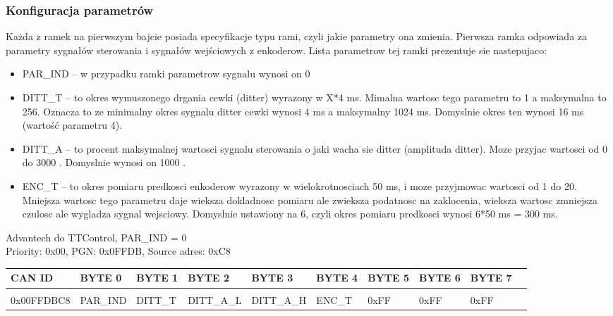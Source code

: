 \documentclass{article}
\begin{document}
\subsubsection{Konfiguracja parametrów}
Każda z ramek na pierwszym bajcie posiada specyfikacje typu rami, czyli jakie parametry ona zmienia.
Pierwsza ramka odpowiada za parametry sygnałów sterowania i sygnałów wejściowych z enkoderow. Lista parametrow tej ramki prezentuje sie nastepujaco:
\begin{itemize}
\item PAR\_IND -- w przypadku ramki parametrow sygnalu wynosi on 0
\item DITT\_T -- to okres wymuszonego drgania cewki (ditter) wyrazony w X*4 ms. Mimalna wartosc tego parametru to 1 a maksymalna to 256. Oznacza to ze minimalny okres sygnalu ditter cewki wynosi 4 ms a maksymalny 1024 ms. Domyslnie okres ten wynosi 16 ms (wartość parametru 4).
\item DITT\_A -- to procent maksymalnej wartosci sygnalu sterowania o jaki wacha sie ditter (amplituda ditter). Moze przyjac wartosci od 0 \permil do 3000 \permil. Domyslnie wynosi on 1000 \permil. 
\item ENC\_T -- to okres pomiaru predkosci enkoderow wyrazony w wielokrotnosciach 50 ms, i moze przyjmowac wartosci od 1 do 20. Mniejsza wartosc tego parametru daje wieksza dokladnosc pomiaru ale zwieksza podatnosc na zaklocenia, wieksza wartosc zmniejsza czulosc ale wygladza sygnal wejsciowy. Domyslnie ustawiony na 6, czyli okres pomiaru predkosci wynosi 6*50 ms  = 300 ms.  
\end{itemize}

Advantech do TTControl, PAR\_IND = 0\\
Priority: 0x00, PGN: 0x0FFDB, Source adres: 0xC8 \\
\begin{left}
\begin{tabular}{ |p{2cm}|p{1.35cm}|p{1.2cm}|p{1.50cm}|p{1.50cm}|p{1.35cm}|p{1.35cm}|p{1.35cm}|p{1.35cm}|p{1.35cm}|} 
 \hline
 CAN ID & BYTE 0 & BYTE 1 & BYTE 2 & BYTE 3 & BYTE 4 & BYTE 5 & BYTE 6 & BYTE 7 \\ \hline
 & & & & & & & &\\
0x00FFDBC8 & PAR\_IND & DITT\_T & DITT\_A\_L & DITT\_A\_H  & ENC\_T & 0xFF & 0xFF & 0xFF\\
 \hline
\end{tabular}
\end{left}\\
\end{document}

